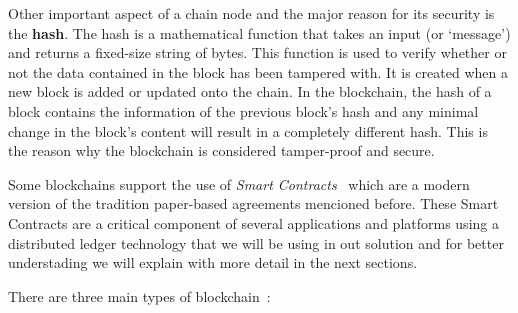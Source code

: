 Other important aspect of a chain node and the major reason for its security is the \textbf{hash}. The hash is a mathematical function that takes an input (or `message') and returns a fixed-size string of bytes.
This function is used to verify whether or not the data contained in the block has been tampered with. It is created when a new block is added or updated onto the chain.
In the blockchain, the hash of a block contains the information of the previous block's hash and any minimal change in the block's content will result in a completely different hash.
This is the reason why the blockchain is considered tamper-proof and secure.

Some blockchains support the use of \textit{Smart Contracts}~\cite{kaur2023introduction} which are a modern version of the tradition paper-based agreements mencioned before.
These Smart Contracts are a critical component of several applications and platforms using a distributed ledger technology that we will be using in out solution and for better understading we will explain with
more detail in the next sections.

There are three main types of blockchain~\cite{paul2021blockchain}:

